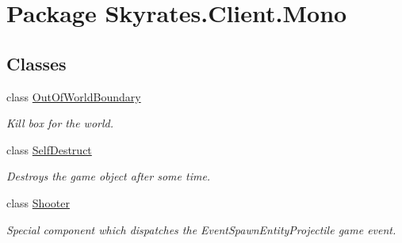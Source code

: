 \hypertarget{namespace_skyrates_1_1_client_1_1_mono}{\section{Package Skyrates.\-Client.\-Mono}
\label{namespace_skyrates_1_1_client_1_1_mono}
}
\subsection*{Classes}
\begin{DoxyCompactItemize}
\item 
class \hyperlink{class_skyrates_1_1_client_1_1_mono_1_1_out_of_world_boundary}{Out\-Of\-World\-Boundary}
\begin{DoxyCompactList}\small\item\em Kill box for the world. \end{DoxyCompactList}\item 
class \hyperlink{class_skyrates_1_1_client_1_1_mono_1_1_self_destruct}{Self\-Destruct}
\begin{DoxyCompactList}\small\item\em Destroys the game object after some time. \end{DoxyCompactList}\item 
class \hyperlink{class_skyrates_1_1_client_1_1_mono_1_1_shooter}{Shooter}
\begin{DoxyCompactList}\small\item\em Special component which dispatches the Event\-Spawn\-Entity\-Projectile game event. \end{DoxyCompactList}\end{DoxyCompactItemize}
